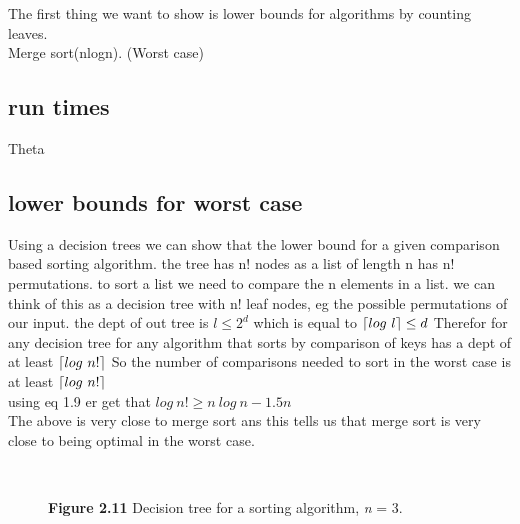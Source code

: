 \documentclass[a4paper,10pt,titlepage]{report}
\DeclarePairedDelimiter{\ceil}{\lceil}{\rceil}
\begin{document}
The first thing we want to show is lower bounds for algorithms by counting leaves.\\

Merge sort(nlogn). (Worst case)\\
\subsection{run times}

Theta

\subsection{lower bounds for worst case}
Using a decision trees we can show that the lower bound for a given comparison based sorting algorithm. the tree has n! nodes as a list of length n has n! permutations. to sort a list we need to compare the n elements in a list. we can think of this as a decision tree with n! leaf nodes, eg the possible permutations of our input. the dept of out tree is $l \leq 2^d$ which is equal to $\ceil{log \ l} \leq d$ Therefor for any decision tree for any algorithm that sorts by comparison of keys has a dept of at least $\ceil{log \ n!}$
So the number of comparisons needed to sort in the worst case is at least $\ceil{log \ n!}$ \\

using eq 1.9 er get that $ log \ n! \geq n \ log \ n - 1.5n$\\

The above is very close to merge sort ans this tells us that merge sort is very close to being optimal in the worst case.

    
\begin{figure}[h]
\\
\caption{\textbf{Figure 2.11} Decision tree for a sorting algorithm, \textit{n} = 3.}
\end{figure}
\end{document}
